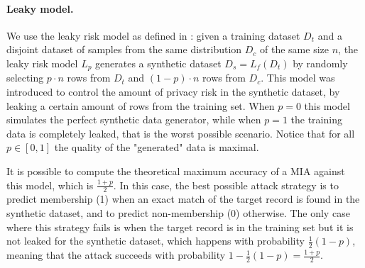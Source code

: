 \paragraph{Leaky model.}
We use the leaky risk model as defined in \citet{palacios2025empirical}: given a training dataset $D_{t}$ and a disjoint dataset of samples from the same distribution $D_{c}$ of the same size $n$, the leaky risk model $L_p$ generates a synthetic dataset $D_{s} = L_f(D_{t})$ by randomly selecting $p \cdot n$ rows from $D_{t}$ and $(1-p) \cdot n$ rows from $D_{c}$.
This model was introduced to control the amount of privacy risk in the synthetic dataset, by leaking a certain amount of rows from the training set. When $p=0$ this model simulates the perfect synthetic data generator, while when $p=1$ the training data is completely leaked, that is the worst possible scenario.
Notice that for all $p \in [0,1]$ the quality of the "generated" data is maximal.

It is possible to compute the theoretical maximum accuracy of a MIA against this model, which is $\frac{1 + p}{2}$.
In this case, the best possible attack strategy is to predict membership (1) when an exact match of the target record is found in the synthetic dataset, and to predict non-membership (0) otherwise. The only case where this strategy fails is when the target record is in the training set but it is not leaked for the synthetic dataset, which happens with probability $\frac{1}{2}(1-p)$,
meaning that the attack succeeds with probability $1 - \frac{1}{2}(1-p) = \frac{1 + p}{2}$.

